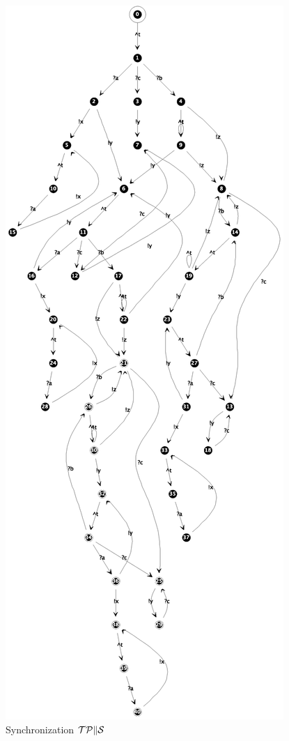 \begin{figure}[htbp]
    \centering
    \includegraphics[height=.9\textheight]{figures/fig-sample-iolts-synch.eps}
    \caption{Synchronization ${\cal TP}\|{\cal S}$}
    \label{fig-sample-iolts-synch}
\end{figure}

